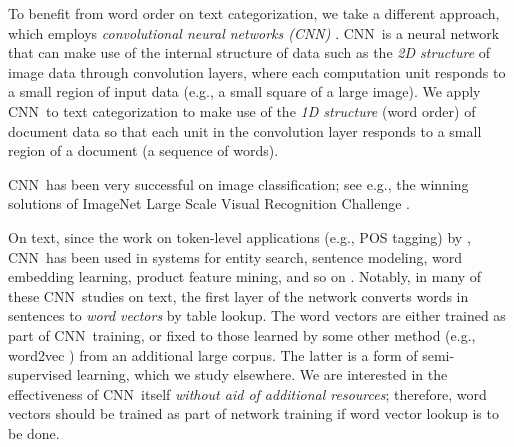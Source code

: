 \documentclass[11pt,letterpaper]{article}
\newcommand{\cnn}{CNN}
\begin{document}
To benefit from word order on text categorization, 
we take a different approach, 
which employs {\em convolutional neural networks (\cnn)}
\cite{LeCun+etal98}. 
\cnn\ is a neural network that can make use of the internal structure of data 
such as the {\em 2D structure} of image data through convolution layers, 
where each computation unit responds to a small region of input data 
(e.g., a small square of a large image).  We apply \cnn\ to text 
categorization to make use of the {\em 1D structure} (word order) 
of document data so that each unit in the convolution layer responds to 
a small region of a document (a sequence of words).

\cnn\ has been very successful on image classification; see e.g., 
the winning solutions of ImageNet Large Scale Visual Recognition Challenge 
 \cite{imagenetNips12,Szegedy+etal14,Russakovsky+etal14}.  

On text, 
since the work on token-level applications (e.g., POS tagging) by 
, 
\cnn\ has been used in systems for 
entity search,  sentence modeling, word embedding learning, product feature mining, and so on 
\cite{XS13,Gao+etal14,Shen+etal14,KGB14,XLLZ14,Tang+etal14,WCA14,Kim14}.  
Notably, in many of these \cnn\ studies on text, 
the first layer of the network converts words in sentences 
to {\em word vectors} by table lookup.  
The word vectors are either trained as part of \cnn\ training, or 
fixed to those learned by some other method 
(e.g., word2vec \cite{wvecNips13}) from an additional large corpus.  
The latter is a form of semi-supervised learning, which we study elsewhere. 
We are interested in the effectiveness of \cnn\ itself 
{\em without aid of additional resources}; therefore, 
word vectors should be trained as part of network training 
if word vector lookup is to be done.  
\end{document}
